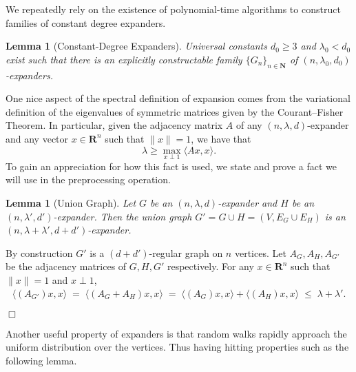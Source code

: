 \documentclass{article}
\newtheorem{lemma}[theorem]{Lemma}
\newenvironment{proof}{\noindent{\bf Proof:} \hspace*{1mm}}{
	\hspace*{\fill} $\Box$ }
\newcommand{\N}{{\mathbf N}}
\newcommand{\R}{{\mathbf R}}
\newcommand{\eqdef}{\mathbin{\stackrel{\rm def}{=}}}
\begin{document}
We repeatedly rely on the existence of polynomial-time algorithms
to construct families of constant degree expanders.

\begin{lemma}[Constant-Degree Expanders]\label{expandersexist}
Universal constants $d_0 \ge 3$ and $\lambda_0<d_0$ exist such that there
is an explicitly constructable %
family $\{G_n\}_{n\in \N}$ of $(n, \lambda_0, d_0)$-expanders.%
\end{lemma}

One nice aspect of the spectral definition of
expansion comes from the variational definition of the eigenvalues
of symmetric matrices given by the Courant--Fisher Theorem.
In particular, given the adjacency matrix $A$ of any $(n, \lambda, d)$-expander
and any vector $x \in \R^n$ such that $\|x\| = 1$, we have that
$$
\lambda \ge \max_{x \perp 1} \langle Ax, x\rangle. %
$$
To gain an appreciation for how this fact is used, we state and prove a
fact we will use in the preprocessing operation.

\begin{lemma}[Union Graph]\label{union}
Let $G$ be an $(n, \lambda, d)$-expander and $H$ be an $(n, \lambda', d')$-expander.
Then the \emph{union graph} $G' = G \cup H = (V, E_G \cup E_H)$ is an
$(n, \lambda + \lambda', d+d')$-expander.
\end{lemma}

\begin{proof}
By construction $G'$ is a $(d+d')$-regular graph on $n$ vertices.
Let $A_G, A_H, A_{G'}$ be the adjacency matrices of $G, H, G'$ respectively.
For any $x \in \R^n$ such that $\|x\| = 1$ and $x \perp 1$,
\begin{align*}
\langle (A_{G'})x, x\rangle
  \;=\; \langle (A_G+A_H)x, x\rangle
  \;=\; \langle (A_G)x, x\rangle + \langle (A_H)x, x\rangle
  \;\le\; \lambda + \lambda'.%
\end{align*}
\end{proof}

Another useful property of expanders is that random walks rapidly approach
the uniform distribution over the vertices.
Thus having hitting properties such as the following lemma. 

\end{document}
